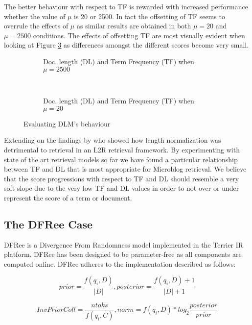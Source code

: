 The better behaviour with respect to TF is rewarded with increased performance whether the value of $\mu$ is 20 or 2500. In fact the offsetting of TF seems to overrule the effects of $\mu$ as similar results are obtained in both $\mu=20$ and $\mu=2500$ conditions. The effects of offsetting TF are most visually evident when looking at Figure \ref{dlmfigureTFDL20} as differences amongst the different scores become very small. 


\begin{figure}
      	\begin{subfigure}[b]{0.5\textwidth}
          \centering
          \caption{Doc. length (DL) and Term Frequency (TF) when $\mu = 2500$}
          
          \label{dlmfigureTFDL2500}          
        \end{subfigure} 
        ~
 		\begin{subfigure}[b]{0.5\textwidth}
          \centering
          \caption{Doc. length (DL) and Term Frequency (TF) when $\mu = 20$}
          
          \label{dlmfigureTFDL20}          
        \end{subfigure} 
        \caption{Evaluating DLM's behaviour}
\end{figure}

Extending on the findings by \cite{naveed2011searching} who showed how length normalization was detrimental to retrieval in an L2R retrieval framework. By experimenting with state of the art retrieval models so far we have found a particular relationship between TF and DL that is most appropriate for Microblog retrieval. We believe that the score progressions with respect to TF and DL should resemble a very soft slope due to the very low TF and DL values in order to not over or under represent the score of a term or document.

\subsection{The DFRee Case}
DFRee is a Divergence From Randomness model implemented in the Terrier IR platform. DFRee has been designed to be parameter-free as all components are computed online. DFRee adheres to the implementation described as follows:

\begin{equation}
prior = \frac{f(q_i, D)}{|D|}, posterior = \frac{f(q_i, D)+1}{|D|+1} 
\end{equation}

\begin{equation}
InvPriorColl = \frac{ntoks}{f(q_i, C)}, norm = f(q_i, D)*log_2{\frac{posterior}{prior}}
\end{equation}

